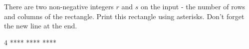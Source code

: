 




There are two non-negative integers $r$ and $s$ on the input - the number of rows and columns of the rectangle. Print this rectangle using asterisks. Don't forget the new line at the end.

4
\vystup
****
****
****
\koniec

